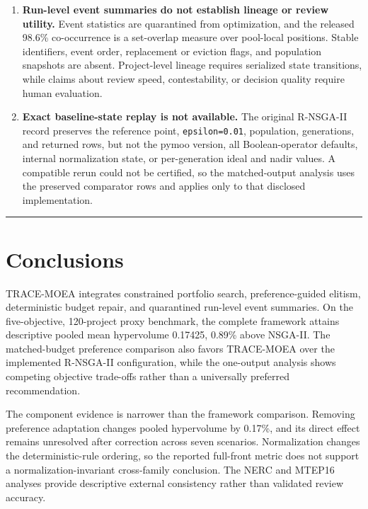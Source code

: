 \documentclass[energies,article,submit,moreauthors]{Definitions/mdpi}
\begin{document}
\begin{enumerate}
\item
  \textbf{Run-level event summaries do not establish lineage or review utility.} Event statistics are quarantined from optimization, and the released 98.6\% co-occurrence is a set-overlap measure over pool-local positions. Stable identifiers, event order, replacement or eviction flags, and population snapshots are absent. Project-level lineage requires serialized state transitions, while claims about review speed, contestability, or decision quality require human evaluation.
\item
  \textbf{Exact baseline-state replay is not available.} The original R-NSGA-II record preserves the reference point, \texttt{epsilon=0.01}, population, generations, and returned rows, but not the pymoo version, all Boolean-operator defaults, internal normalization state, or per-generation ideal and nadir values. A compatible rerun could not be certified, so the matched-output analysis uses the preserved comparator rows and applies only to that disclosed implementation.
\end{enumerate}

\begin{center}\rule{0.5\linewidth}{0.5pt}\end{center}

\section{Conclusions}\label{conclusions}

TRACE-MOEA integrates constrained portfolio search, preference-guided elitism, deterministic budget repair, and quarantined run-level event summaries. On the five-objective, 120-project proxy benchmark, the complete framework attains descriptive pooled mean hypervolume 0.17425, 0.89\% above NSGA-II. The matched-budget preference comparison also favors TRACE-MOEA over the implemented R-NSGA-II configuration, while the one-output analysis shows competing objective trade-offs rather than a universally preferred recommendation.

The component evidence is narrower than the framework comparison. Removing preference adaptation changes pooled hypervolume by 0.17\%, and its direct effect remains unresolved after correction across seven scenarios. Normalization changes the deterministic-rule ordering, so the reported full-front metric does not support a normalization-invariant cross-family conclusion. The NERC and MTEP16 analyses provide descriptive external consistency rather than validated review accuracy.
\end{document}
